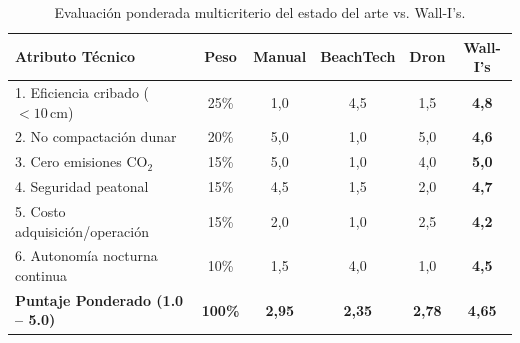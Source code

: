 \documentclass[12pt,letterpaper]{article}
\begin{document}
\begin{table}[h!]
\centering
\small
{}
\begin{tabularx}{\textwidth}{p{3.8cm} c c c c c}
\toprule
\textbf{Atributo Técnico} & \textbf{Peso} & \textbf{Manual} & \textbf{BeachTech} & \textbf{Dron} & \textbf{Wall-I's} \\
\midrule
1. Eficiencia cribado ($<10\,\text{cm}$) & 25\% & 1,0 & 4,5 & 1,5 & \textbf{4,8} \\
2. No compactación dunar & 20\% & 5,0 & 1,0 & 5,0 & \textbf{4,6} \\
3. Cero emisiones CO$_2$ & 15\% & 5,0 & 1,0 & 4,0 & \textbf{5,0} \\
4. Seguridad peatonal & 15\% & 4,5 & 1,5 & 2,0 & \textbf{4,7} \\
5. Costo adquisición/operación & 15\% & 2,0 & 1,0 & 2,5 & \textbf{4,2} \\
6. Autonomía nocturna continua & 10\% & 1,5 & 4,0 & 1,0 & \textbf{4,5} \\
\midrule
\textbf{Puntaje Ponderado (1.0 -- 5.0)} & \textbf{100\%} & \textbf{2,95} & \textbf{2,35} & \textbf{2,78} & \textbf{4,65} \\
\bottomrule
\end{tabularx}
\caption{Evaluación ponderada multicriterio del estado del arte vs. Wall-I's.}
\end{table}
\end{document}
